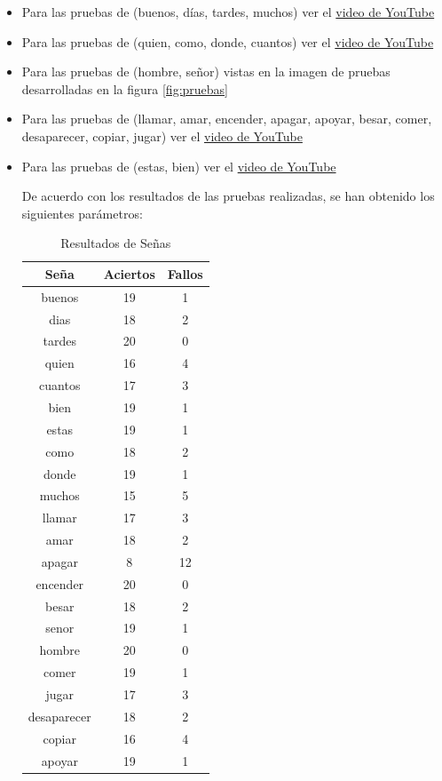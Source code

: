 \documentclass[conference]{IEEEtran}
\begin{document}
\begin{itemize}
    \item Para las pruebas de (buenos, días, tardes, muchos) ver el \href{https://www.youtube.com/shorts/NHADjfgkAjA}{video de YouTube} 

    \item Para las pruebas de (quien, como, donde, cuantos) ver el
    \href{https://www.youtube.com/watch?v=6XGl2R5JMyc }{video de YouTube} 

    \item Para las pruebas de (hombre, señor) vistas en la imagen de pruebas desarrolladas en la figura \ref{fig:pruebas}

    \item Para las pruebas de  (llamar, amar, encender, apagar, apoyar, besar, comer, desaparecer, copiar, jugar) ver el
    \href{https://www.youtube.com/watch?v=WXj9XSjwZcI}{video de YouTube} 

    \item Para las pruebas de (estas, bien) ver el \href{https://www.youtube.com/watch?v=8KVeaX35zLQ&t=180s }{video de YouTube}

\hfill \break
De acuerdo con los resultados de las pruebas realizadas, se han obtenido los siguientes parámetros:
\begin{table}[h]
\centering
\caption{Resultados de Señas}
\begin{tabular}{|c|c|c|}
\hline
\textbf{Seña} & \textbf{Aciertos} & \textbf{Fallos} \\
\hline
buenos & 19 & 1 \\
\hline
dias & 18 & 2 \\
\hline
tardes & 20 & 0 \\
\hline
quien & 16 & 4 \\
\hline
cuantos & 17 & 3 \\
\hline
bien & 19 & 1 \\
\hline
estas & 19 & 1 \\
\hline
como & 18 & 2 \\
\hline
donde & 19 & 1 \\
\hline
muchos & 15 & 5 \\
\hline
llamar & 17 & 3 \\
\hline
amar & 18 & 2 \\
\hline
apagar & 8 & 12 \\
\hline
encender & 20 & 0 \\
\hline
besar & 18 & 2 \\
\hline
senor & 19 & 1 \\
\hline
hombre & 20 & 0 \\
\hline
comer & 19 & 1 \\
\hline
jugar & 17 & 3 \\
\hline
desaparecer & 18 & 2 \\
\hline
copiar & 16 & 4 \\
\hline
apoyar & 19 & 1 \\
\hline
\end{tabular}
\end{table}
\end{itemize}
\end{document}
